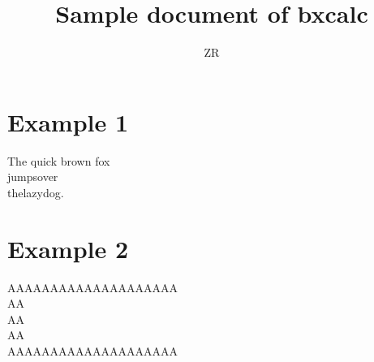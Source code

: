 \documentclass[a4paper]{article}
\title{Sample document of \textsf{bxcalc}}
\author{ZR}
\date{}
\begin{document}
\maketitle

\section{Example 1}

\noindent
The quick brown fox\\[1ex-1ls]%
jump\hspace{6tm}s\hspace{12tm}ov\hspace{2tm}er\\[1ex-1ls]
\hspace*{3tm}t\hspace{4tm}he\hspace{9tm}lazy\hspace{4tm}dog.

\section{Example 2}

\noindent
AAAAAAAAAAAAAAAAAAAA\\[\heightof{A}-1ls+2tm]
AA\\[\heightof{A}-1ls+2tm]
AA\\[\heightof{A}-1ls+2tm]
AA\\[\heightof{A}-1ls+2tm]
AAAAAAAAAAAAAAAAAAAA
\end{document}
